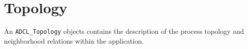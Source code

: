 \section{Topology}

An {\tt ADCL\_Topology} objects contains the description of the process topology and neighborhood relations within the application.